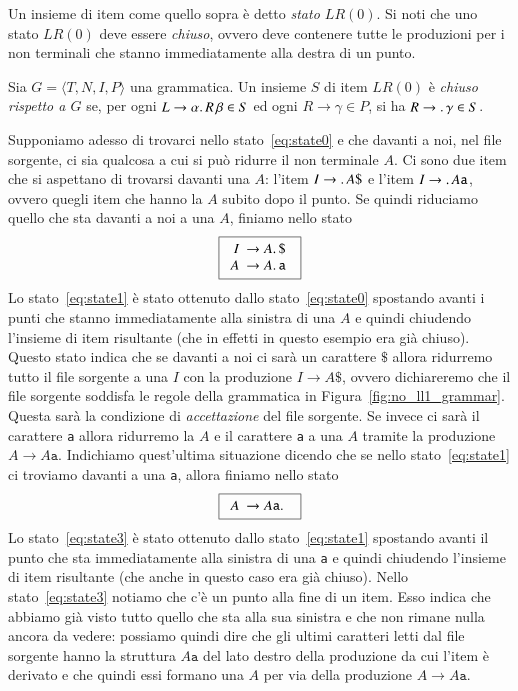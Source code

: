 Un insieme di item come quello sopra \`e detto \emph{stato $\mathit{LR}(0)$}.
Si noti che uno stato $\mathit{LR}(0)$ deve essere \emph{chiuso}, ovvero deve
contenere tutte le produzioni
per i non terminali che stanno immediatamente alla destra di un punto.
%
\begin{definition}\label{def:lr_state}
Sia $G=\langle T,N,I,P\rangle$ una grammatica.
Un insieme $S$ di item $\mathit{LR}(0)$
\`e \emph{chiuso rispetto a $G$} se, per ogni
$L\to\alpha.\, R\,\beta\in S$ ed ogni $R\to\gamma\in P$, si ha
$R\to.\,\gamma\in S$.
\end{definition}
%
Supponiamo adesso di trovarci nello stato~\eqref{eq:state0} e che davanti a
noi, nel file sorgente, ci sia qualcosa a cui si pu\`o ridurre il non
terminale $A$. Ci sono due item che si aspettano di trovarsi davanti una $A$:
l'item $I\to.\, A\mathtt{\$}$ e l'item $I\to.\, A\mathtt{a}$, ovvero
quegli item che hanno la $A$ subito dopo il punto. Se quindi riduciamo
quello che sta davanti a noi a una $A$, finiamo nello stato
\begin{equation}\label{eq:state1}
  \fbox{$
  \begin{array}{rl}
     I \!\!\!& \to A.\,\mathtt{\$}\\
     A \!\!\!& \to A.\,\mathtt{a}
  \end{array}$
  }
\end{equation}
Lo stato~\eqref{eq:state1} \`e stato ottenuto dallo stato~\eqref{eq:state0}
spostando avanti i punti che stanno immediatamente alla sinistra di una $A$
e quindi chiudendo l'insieme di item
risultante (che in effetti in questo esempio era gi\`a chiuso).
Questo stato indica che se davanti a noi ci sar\`a un carattere $\mathtt{\$}$
allora ridurremo tutto il file sorgente a una $I$ con la produzione
$I\to A\mathtt{\$}$, ovvero dichiareremo che il file sorgente soddisfa
le regole della grammatica in Figura~\ref{fig:no_ll1_grammar}.
Questa sar\`a la condizione di \emph{accettazione} del file sorgente.
Se invece ci sar\`a il carattere \texttt{a} allora
ridurremo la $A$ e il carattere \texttt{a} a una $A$ tramite la
produzione $A\to A\mathtt{a}$. Indichiamo quest'ultima situazione dicendo
che se nello stato~\eqref{eq:state1} ci troviamo davanti a una \texttt{a},
allora finiamo nello stato
\begin{equation}\label{eq:state3}
  \fbox{$
  \begin{array}{rl}
     A \!\!\!& \to A\mathtt{a}.\,
  \end{array}$
  }
\end{equation}
Lo stato~\eqref{eq:state3} \`e stato ottenuto dallo stato~\eqref{eq:state1}
spostando avanti il punto che sta immediatamente alla sinistra di una
\texttt{a} e quindi chiudendo l'insieme di item risultante
(che anche in questo caso era gi\`a chiuso).
Nello stato~\eqref{eq:state3} notiamo che c'\`e un punto alla fine di un item.
Esso indica che abbiamo gi\`a
visto tutto quello che sta alla sua sinistra e che non rimane nulla
ancora da vedere: possiamo quindi dire che gli ultimi caratteri letti
dal file sorgente hanno la struttura $A\mathtt{a}$ del lato destro della
produzione da cui l'item \`e derivato e che quindi essi formano una $A$ per
via della produzione $A\to A\mathtt{a}$.

